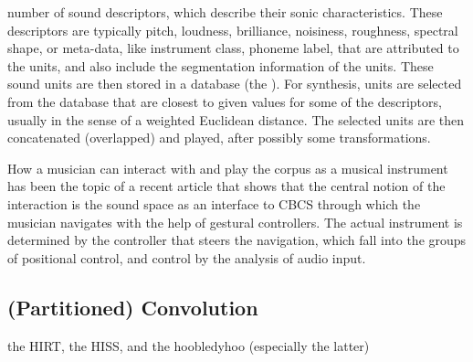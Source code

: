 number of sound descriptors, which describe their sonic characteristics.
These descriptors are typically pitch, loudness, brilliance, noisiness, roughness, spectral shape, or meta-data, like instrument class, phoneme label, that are attributed to the units,
and also include the segmentation information of the units.
These sound units are then stored in a database (the ).  For synthesis, units are
selected from the database that are closest to given  values for some of the
descriptors, usually in the sense of a weighted Euclidean distance.
The selected units are then concatenated (overlapped) and played, after possibly some transformations.


How a musician can interact with and play the corpus as a musical instrument has been the topic of a recent article \cite{Schwarz-nime2012-sound-space} that shows that the central notion of the interaction is the sound space as an interface to CBCS through which the musician navigates with the help of gestural controllers.  
The actual instrument is determined by the controller that steers the
navigation, which fall into the groups of positional control, and control by the analysis of audio
input.


\subsection{(Partitioned) Convolution}


the HIRT, the HISS, and the hoobledyhoo (especially the latter)

